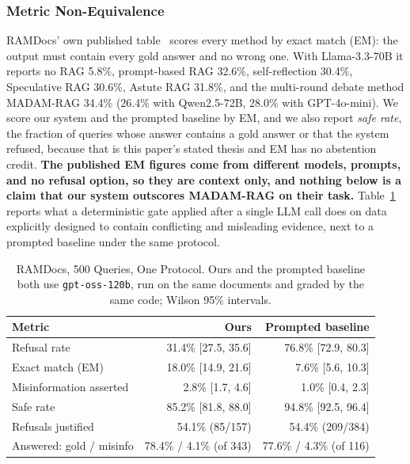 \documentclass[conference]{IEEEtran}
\begin{document}
\subsubsection{Metric Non-Equivalence}
RAMDocs' own published table~\cite{wang2025ramdocs} scores every method by
exact match (EM): the output must contain every gold answer and no wrong one.
With Llama-3.3-70B it reports no RAG 5.8\%, prompt-based RAG 32.6\%,
self-reflection 30.4\%, Speculative RAG 30.6\%, Astute RAG 31.8\%, and the
multi-round debate method MADAM-RAG 34.4\% (26.4\% with Qwen2.5-72B, 28.0\%
with GPT-4o-mini). We score
our system and the prompted baseline by EM, and we also report
\textit{safe rate}, the fraction of queries whose answer contains a gold
answer or that the system refused, because that is this paper's stated
thesis and EM has no abstention credit. \textbf{The published EM figures
come from different models, prompts, and no refusal option, so they are
context only, and nothing below is a claim that our system outscores
MADAM-RAG on their task.} Table~\ref{tab:ramdocs_main} reports what a
deterministic gate applied after a single LLM call does on data explicitly
designed to contain conflicting and misleading evidence, next to a prompted
baseline under the same protocol.

\begin{table}[htbp]
\caption{RAMDocs, 500 Queries, One Protocol. Ours and the prompted baseline
both use \texttt{gpt-oss-120b}, run on the same documents and graded by the
same code; Wilson 95\% intervals.}
\label{tab:ramdocs_main}
\centering
\footnotesize
\begin{tabularx}{\columnwidth}{@{}X r r@{}}
\toprule
Metric & Ours & Prompted baseline \\
\midrule
Refusal rate              & 31.4\% [27.5, 35.6] & 76.8\% [72.9, 80.3] \\
Exact match (EM)          & 18.0\% [14.9, 21.6] & 7.6\% [5.6, 10.3] \\
Misinformation asserted   & 2.8\% [1.7, 4.6]    & 1.0\% [0.4, 2.3] \\
Safe rate                 & 85.2\% [81.8, 88.0] & 94.8\% [92.5, 96.4] \\
Refusals justified        & 54.1\% (85/157)     & 54.4\% (209/384) \\
Answered: gold / misinfo  & 78.4\% / 4.1\% (of 343) & 77.6\% / 4.3\% (of 116) \\
\bottomrule
\end{tabularx}
\end{table}
\end{document}
